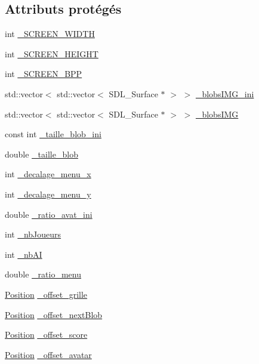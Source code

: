\subsection*{Attributs protégés}
\begin{DoxyCompactItemize}
\item 
int \hyperlink{a00011_a6f00bbd8d46ea6a53c148bc74a78db05}{\_\-SCREEN\_\-WIDTH}
\item 
int \hyperlink{a00011_a9da581df6276df3710ac37ae617360bb}{\_\-SCREEN\_\-HEIGHT}
\item 
int \hyperlink{a00011_a1b36ec980a5220505bbae259cc96bc2c}{\_\-SCREEN\_\-BPP}
\item 
std::vector$<$ std::vector$<$ SDL\_\-Surface $\ast$ $>$ $>$ \hyperlink{a00011_a4d99a064e76835578ea5363a76d13ade}{\_\-blobsIMG\_\-ini}
\item 
std::vector$<$ std::vector$<$ SDL\_\-Surface $\ast$ $>$ $>$ \hyperlink{a00011_aa47d2f27a33563cbadfdd7c98ff729f9}{\_\-blobsIMG}
\item 
const int \hyperlink{a00011_a88f27d619ba61b4e9105d0be4b1ae474}{\_\-taille\_\-blob\_\-ini}
\item 
double \hyperlink{a00011_accea7493bc80f704415600c1e3925df2}{\_\-taille\_\-blob}
\item 
int \hyperlink{a00011_a63d8eb39c2413f9525cb5af3795672ac}{\_\-decalage\_\-menu\_\-x}
\item 
int \hyperlink{a00011_a4bc8fbcc5e5b60221023ecacac71ce57}{\_\-decalage\_\-menu\_\-y}
\item 
double \hyperlink{a00011_a5b2280558d08c0c82dc1231af910617c}{\_\-ratio\_\-avat\_\-ini}
\item 
int \hyperlink{a00011_aef41c15d24fd691d1e3c05b387a8fd96}{\_\-nbJoueurs}
\item 
int \hyperlink{a00011_a9d9ba47a3441ea5ae681f1a9111a91af}{\_\-nbAI}
\item 
double \hyperlink{a00011_a49855d7045bc2dec7eee28540691d17b}{\_\-ratio\_\-menu}
\item 
\hyperlink{a00014}{Position} \hyperlink{a00011_a722c39f202350477d29c25ed9f71eadb}{\_\-offset\_\-grille}
\item 
\hyperlink{a00014}{Position} \hyperlink{a00011_a8359bf13315c6fda156c755fedf87712}{\_\-offset\_\-nextBlob}
\item 
\hyperlink{a00014}{Position} \hyperlink{a00011_af08b50a0e9a62b88613d6eda29e61fe3}{\_\-offset\_\-score}
\item 
\hyperlink{a00014}{Position} \hyperlink{a00011_a21d0a8fbd79bd252269cad9461e97fa4}{\_\-offset\_\-avatar}

\end{DoxyCompactItemize}

